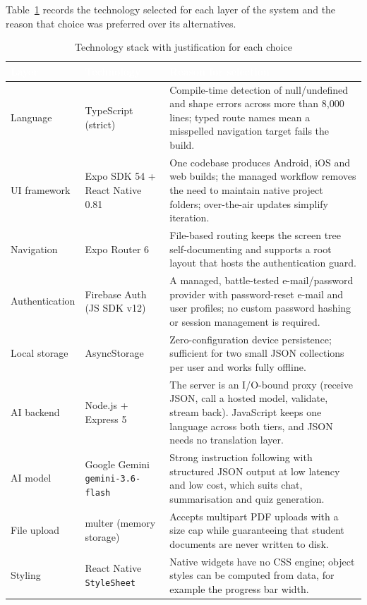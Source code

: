 \documentclass[12pt,a4paper,oneside]{report}
\begin{document}
Table~\ref{tab:stack} records the technology selected for each layer of the system and the reason that choice was preferred over its alternatives.

\begin{table}[H]
\centering
\caption{Technology stack with justification for each choice}
\label{tab:stack}
\small
\begin{tabularx}{\textwidth}{@{}p{2.5cm}p{3.2cm}X@{}}
\toprule
\rowcolor{tblhead} \textcolor{white}{\textbf{Layer}} &
\textcolor{white}{\textbf{Technology}} &
\textcolor{white}{\textbf{Reason for selection}} \\
\midrule
Language     & TypeScript (strict) & Compile-time detection of null/undefined and
               shape errors across more than 8{,}000 lines; typed route names mean a
               misspelled navigation target fails the build. \\
UI framework & Expo SDK 54 + React Native 0.81 & One codebase produces Android, iOS
               and web builds; the managed workflow removes the need to maintain
               native project folders; over-the-air updates simplify iteration. \\
Navigation   & Expo Router 6 & File-based routing keeps the screen tree self-documenting
               and supports a root layout that hosts the authentication guard. \\
Authentication & Firebase Auth (JS SDK v12) & A managed, battle-tested e-mail/password
               provider with password-reset e-mail and user profiles; no custom
               password hashing or session management is required. \\
Local storage & AsyncStorage & Zero-configuration device persistence; sufficient for
               two small JSON collections per user and works fully offline. \\
AI backend   & Node.js + Express 5 & The server is an I/O-bound proxy (receive JSON,
               call a hosted model, validate, stream back). JavaScript keeps one
               language across both tiers, and JSON needs no translation layer. \\
AI model     & Google Gemini \texttt{gemini-3.6-flash} & Strong instruction following
               with structured JSON output at low latency and low cost, which suits
               chat, summarisation and quiz generation. \\
File upload  & multer (memory storage) & Accepts multipart PDF uploads with a size cap
               while guaranteeing that student documents are never written to disk. \\
Styling      & React Native \texttt{StyleSheet} & Native widgets have no CSS engine;
               object styles can be computed from data, for example the progress bar
               width. \\
\bottomrule
\end{tabularx}
\end{table}
\end{document}
